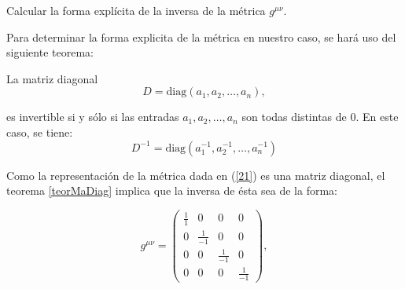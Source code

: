 \begin{exercise}
Calcular la forma explícita de la inversa de la m\'{e}trica $g^{\mu \nu }$.
\end{exercise}
\begin{solution}
Para determinar la forma explicita de la métrica en nuestro caso, se hará uso del
siguiente teorema:
\begin{theorem}
La matriz diagonal
\begin{equation*}
 D=\text{diag}(a_{1},a_{2},\dots,a_{n}),   
\end{equation*}

es invertible si y sólo si las entradas $a_{1},a_{2},\dots,a_{n}$ son todas distintas de $0$. En este caso, se tiene:
\begin{equation}
   D^{-1}=\text{diag}(a_{1}^{-1},a_{2}^{-1},\dots,a_{n}^{-1}) 
\end{equation}
\label{teorMaDiag}
\end{theorem}
Como la representación de la métrica dada en (\ref{21}) es una matriz diagonal, el teorema \ref{teorMaDiag} implica que la inversa de ésta sea de la forma:

\begin{equation}
g^{\mu \nu }=\left( 
\begin{array}{cccc}
\frac{1}{1} & 0 & 0 & 0 \\ 
0 & \frac{1}{-1} & 0 & 0 \\ 
0 & 0 & \frac{1}{-1} & 0 \\ 
0 & 0 & 0 & \frac{1}{-1}
\end{array}
\right)   \label{25a},
\end{equation}


\end{solution}
